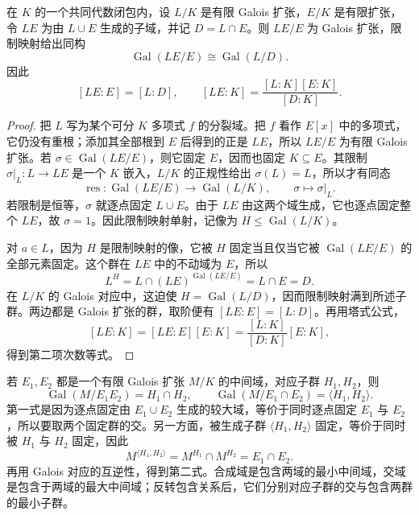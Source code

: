 \begin{proposition}\label{b1:prop:galois-compositum}
	在 \(K\) 的一个共同代数闭包内，设 \(L/K\) 是有限 Galois 扩张，\(E/K\) 是有限扩张，令 \(LE\) 为由 \(L\cup E\) 生成的子域，并记 \(D=L\cap E\)。则 \(LE/E\) 为 Galois 扩张，限制映射给出同构
	\[
		\operatorname{Gal}(LE/E)\cong\operatorname{Gal}(L/D).
	\]
	因此
	\[
		[LE:E]=[L:D],\qquad [LE:K]=\frac{[L:K][E:K]}{[D:K]}.
	\]
\end{proposition}
\begin{proof}
	把 \(L\) 写为某个可分 \(K\) 多项式 \(f\) 的分裂域。把 \(f\) 看作 \(E[x]\) 中的多项式，它仍没有重根；添加其全部根到 \(E\) 后得到的正是 \(LE\)，所以 \(LE/E\) 为有限 Galois 扩张。若 \(\sigma\in\operatorname{Gal}(LE/E)\)，则它固定 \(E\)，因而也固定 \(K\subseteq E\)。其限制 \(\sigma|_L:L\rightarrow LE\) 是一个 \(K\) 嵌入，\(L/K\) 的正规性给出 \(\sigma(L)=L\)，所以才有同态
	\[
		\operatorname{res}:\operatorname{Gal}(LE/E)\longrightarrow\operatorname{Gal}(L/K), \qquad \sigma\longmapsto\sigma|_L.
	\]
	若限制是恒等，\(\sigma\) 就逐点固定 \(L\cup E\)。由于 \(LE\) 由这两个域生成，它也逐点固定整个 \(LE\)，故 \(\sigma=1\)。因此限制映射单射，记像为 \(H\leq\operatorname{Gal}(L/K)\)。

	对 \(a\in L\)，因为 \(H\) 是限制映射的像，它被 \(H\) 固定当且仅当它被 \(\operatorname{Gal}(LE/E)\) 的全部元素固定。这个群在 \(LE\) 中的不动域为 \(E\)，所以
	\[
		L^H=L\cap(LE)^{\operatorname{Gal}(LE/E)}=L\cap E=D.
	\]
	在 \(L/K\) 的 Galois 对应中，这迫使 \(H=\operatorname{Gal}(L/D)\)，因而限制映射满到所述子群。两边都是 Galois 扩张的群，取阶便有 \([LE:E]=[L:D]\)。再用塔式公式，
	\[
		[LE:K]=[LE:E][E:K] =\frac{[L:K]}{[D:K]}[E:K],
	\]
	得到第二项次数等式。
\end{proof}
若 \(E_1,E_2\) 都是一个有限 Galois 扩张 \(M/K\) 的中间域，对应子群 \(H_1,H_2\)，则
\[
	\operatorname{Gal}(M/E_1E_2)=H_1\cap H_2,\qquad \operatorname{Gal}(M/E_1\cap E_2)=\langle H_1,H_2\rangle.
\]
第一式是因为逐点固定由 \(E_1\cup E_2\) 生成的较大域，等价于同时逐点固定 \(E_1\) 与 \(E_2\)，所以要取两个固定群的交。另一方面，被生成子群 \(\langle H_1,H_2\rangle\) 固定，等价于同时被 \(H_1\) 与 \(H_2\) 固定，因此
\[
	M^{\langle H_1,H_2\rangle}=M^{H_1}\cap M^{H_2}=E_1\cap E_2.
\]
再用 Galois 对应的互逆性，得到第二式。合成域是包含两域的最小中间域，交域是包含于两域的最大中间域；反转包含关系后，它们分别对应子群的交与包含两群的最小子群。

